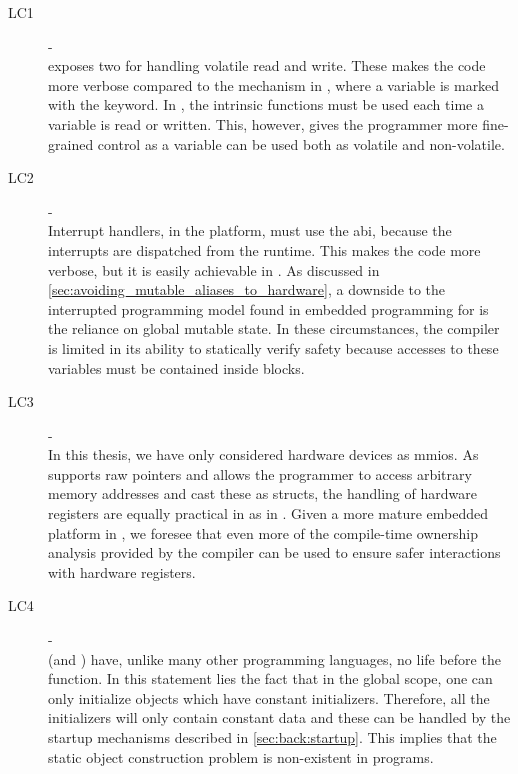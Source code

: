 \begin{description}
\item [LC1] - {\lci} \hfill \\
  {\rust} exposes two  for handling volatile read and write.
  These makes the code more verbose compared to the mechanism in {\C}, where a variable is marked with the  keyword.
  In {\rust}, the intrinsic functions must be used each time a variable is read or written.
  This, however, gives the programmer more fine-grained control as a variable can be used both as volatile and non-volatile.

\item [LC2] - {\lcii} \hfill \\
  Interrupt handlers, in the {\rg} platform, must use the {\C} \gls{abi}, because the interrupts are dispatched from the {\C} runtime.
  This makes the code more verbose, but it is easily achievable in {\rust}.
  As discussed in \autoref{sec:avoiding_mutable_aliases_to_hardware}, a downside to the interrupted programming model found in embedded programming for {\rust} is the reliance on global mutable state.
  In these circumstances, the compiler is limited in its ability to statically verify safety because accesses to these variables must be contained inside {\unsafe} blocks.

\item [LC3] - {\lciii} \hfill \\
  In this thesis, we have only considered hardware devices as \glspl{mmio}.
  As {\rust} supports raw pointers and allows the programmer to access arbitrary memory addresses and cast these as structs, the handling of hardware registers are equally practical in {\rust} as in {\C}.
  Given a more mature embedded platform in {\rust}, we foresee that even more of the compile-time ownership analysis provided by the {\rust} compiler can be used to ensure safer interactions with hardware registers.

\item [LC4] - {\lciv} \hfill \\
  {\rust} (and {\C}) have, unlike many other programming languages, no life before the {\main} function.
  In this statement lies the fact that in the global scope, one can only initialize objects which have constant initializers.
  Therefore, all the initializers will only contain constant data and these can be handled by the startup mechanisms described in \autoref{sec:back:startup}.
  This implies that the static object construction problem is non-existent in {\rust} programs.


\end{description}
